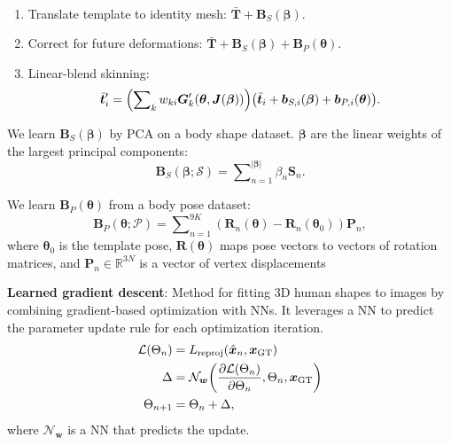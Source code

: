 \documentclass{article}
\newcommand{\lft}{\mathopen{}\mathclose\bgroup\left}
\newcommand{\rgt}{\aftergroup\egroup\right}
\newcommand{\R}{\mathbb{R}}
\renewcommand{\vec}[1]{\bm{#1}}
\newcommand{\mat}[1]{\bm{#1}}
\newenvironment{topic}[1]
{\textbf{\sffamily \colorbox{black}{\rlap{\textbf{\textcolor{white}{#1}}}\hspace{\linewidth}\hspace{-2\fboxsep}}} \\ \vspace{0.2cm}}
{}
\begin{document}
\begin{multicols*}{2}
\begin{topic}{Parametric human body models}
        \begin{enumerate}
            \item Translate template to identity mesh: $\bar{\mat{T}} + \mat{B}_S(\vec{\beta})$.
            \item Correct for future deformations: $\bar{\mat{T}} + \mat{B}_S(\vec{\beta}) +
                      \mat{B}_P(\vec{\theta})$.
            \item Linear-blend skinning: \[
                      \bar{\vec{t}}_i' = \lft( \sum\nolimits_{k} w_{ki} \mat{G}'_k(\vec{\theta}, \mat{J}(\vec{\beta})) \rgt) \lft(\bar{\vec{t}}_i + \vec{b}_{S,i}(\vec{\beta}) + \vec{b}_{P,i}(\vec{\theta})\rgt).
                  \]
        \end{enumerate}

        We learn $\mat{B}_S(\vec{\beta})$ by PCA on a body shape dataset. $\vec{\beta}$ are the linear
        weights of the largest principal components: \[
            \mat{B}_S(\vec{\beta}; \mathcal{S}) = \sum\nolimits_{n=1}^{|\vec{\beta}|} \beta_n \mat{S}_n.
        \]

        We learn $\mat{B}_P(\vec{\theta})$ from a body pose dataset: \[
            \mat{B}_P(\vec{\theta}; \mathcal{P}) = \sum\nolimits_{n=1}^{9K} (\mat{R}_n(\vec{\theta}) - \mat{R}_n(\vec{\theta}_0)) \mat{P}_n,
        \]
        where $\vec{\theta}_0$ is the template pose, $\mat{R}(\vec{\theta})$ maps pose vectors to vectors
        of rotation matrices, and $\mat{P}_n \in \R^{3N}$ is a vector of vertex displacements

        \textbf{Learned gradient descent}: Method for fitting 3D human shapes to images by combining
        gradient-based optimization with NNs. It leverages a NN to predict
        the parameter update rule for each optimization iteration.
        \begin{align*}
            \mathcal{L}(\Theta_n) & = L_{\mathrm{reproj}}(\hat{\vec{x}}_n, \vec{x}_{\mathrm{GT}})                                             \\
            \Delta                & = \mathcal{N}_{\vec{w}}\lft( \pdv{\mathcal{L}(\Theta_n)}{\Theta_n}, \Theta_n, \vec{x}_{\mathrm{GT}} \rgt) \\
            \Theta_{n+1}          & = \Theta_n + \Delta,
        \end{align*}
        where $\mathcal{N}_{\vec{w}}$ is a NN that predicts the update.
    \end{topic}

\end{multicols*}
\end{document}
